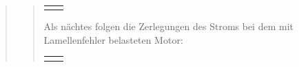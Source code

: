 \begin{quote}
\begin{quote}
\begin{center}
\begin{tabular}{ll}
\begin{minipage}{0.6\textwidth}
                    \end{minipage}
    
                \end{tabular}
                \end{center}
                
                
                \vspace{20em}
                
                
                Als nächtes folgen die Zerlegungen des Stroms bei dem mit
                Lamellenfehler belasteten Motor:
                
                 \begin{center}
                \begin{tabular}{ll}
    
                \hspace{-8em}
                    \begin{minipage}{0.6\textwidth}
    

\end{minipage}
\end{tabular}
\end{center}
\end{quote}
\end{quote}
